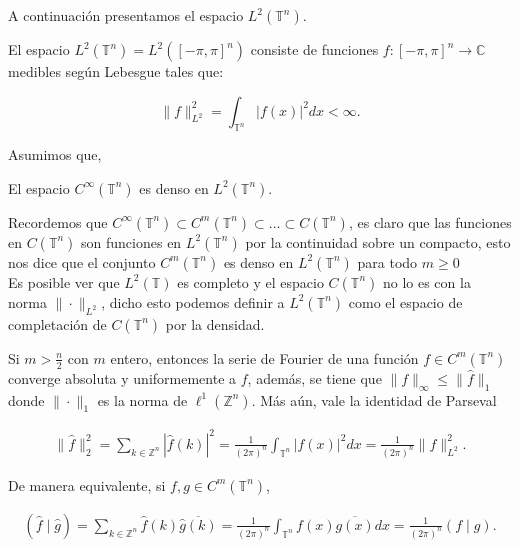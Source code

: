 \documentclass[12pt]{article}
\newcommand\T{\mathbb{T}}
\begin{document}
A continuación presentamos el espacio $L^2(\T^n)$.

\begin{definition}
El espacio $L^2\left(\mathbb{T}^n\right)=L^2\left([-\pi, \pi]^n\right)$ consiste de funciones $f:[-\pi, \pi]^n \rightarrow \mathbb{C}$ medibles según Lebesgue tales que:

$$\|f\|_{L^2}^2=\int_{\T^n}|f(x)|^2 d x<\infty.$$
\end{definition}
Asumimos que,
\begin{theorem}
El espacio $C^{\infty}\left(\mathbb{T}^n\right)$ es denso en $L^2\left(\mathbb{T}^n\right)$.    
\end{theorem}

\begin{note}
Recordemos que $C^{\infty}(\T^n)\subset C^m(\T^ n)\subset  \ldots\subset C(\T^n)$, es claro que las funciones en $C(\T^n)$ son funciones en $L^2(\T^n)$ por la continuidad sobre un compacto, esto nos dice que el conjunto $C^m(\T^n)$ es denso en $L^2(\T^n)$ para todo $m\geq 0$\\

Es posible ver que $L^2(\T)$ es completo y el espacio $C(\T^n)$ no lo es con  la norma $\|\cdot\|_{L^2}$, dicho esto podemos definir a $L^2(\T^n)$ como el espacio de completación de $C(\T^n)$ por la densidad.
\end{note}

\begin{theorem}\label{convergencia}
Si $m>\frac{n}{2}$ con $m$ entero, entonces la serie de Fourier de una función $f \in C^m\left(\mathbb{T}^n\right)$ converge absoluta y uniformemente a $f$, además, se tiene que $\|f\|_{\infty} \leq\|\widehat{f}\|_1$ donde $\|\cdot\|_1$ es la norma de $\ell^1\left(\mathbb{Z}^n\right)$. Más aún, vale la identidad de Parseval

\begin{align}
\|\widehat{f}\|_2^2=\sum_{k \in \mathbb{Z}^n}|\widehat{f}(k)|^2=\frac{1}{(2 \pi)^n} \int_{\T^n}|f(x)|^2 d x=\frac{1}{(2 \pi)^n}\|f\|_{L^2}^2.
\end{align}

De manera equivalente, si $f, g \in C^m\left(\mathbb{T}^n\right)$,

\begin{align}
(\widehat{f} \mid \widehat{g})=\sum_{k \in \mathbb{Z}^n} \widehat{f}(k) \overline{\widehat{g}(k)}=\frac{1}{(2 \pi)^n} \int_{\T^n} f(x) \overline{g(x)} d x=\frac{1}{(2 \pi)^n}(f \mid g).
\end{align}

\end{theorem}
\end{document}
